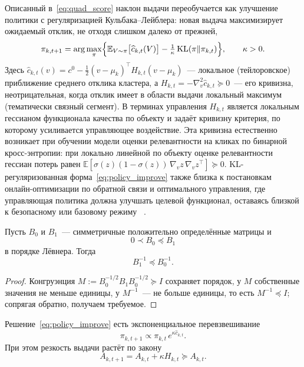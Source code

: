 Описанный в~\eqref{eq:quad_score} наклон выдачи переобучается как улучшение
политики с регуляризацией Кульбака--Лейблера: новая выдача максимизирует
ожидаемый отклик, не отходя слишком далеко от прежней,
\begin{equation}
    \pi_{k,t+1}=\arg\max_{\pi}\Bigl\{
    \mathbb E_{V\sim\pi}\bigl[\widehat c_{k,t}(V)\bigr]
    -\tfrac1\kappa\,\mathrm{KL}(\pi\Vert\pi_{k,t})\Bigr\},
    \qquad \kappa>0.
    \label{eq:policy_improve}
\end{equation}
Здесь $\widehat c_{k,t}(v)=c^0-\tfrac12(v-\mu_k)^\top H_{k,t}(v-\mu_k)$~---
локальное (тейлоровское) приближение среднего отклика кластера, а
$H_{k,t}=-\nabla_v^2 \widehat c_{k,t}\succeq0$~--- его кривизна, неотрицательная,
когда отклик имеет в области выдачи локальный максимум (тематически связный
сегмент). В терминах управления $H_{k,t}$ является локальным гессианом
функционала качества по объекту и задаёт кривизну критерия, по которому
усиливается управляющее воздействие. Эта кривизна естественно возникает при
обучении модели оценки релевантности на кликах по бинарной кросс-энтропии: при
локально линейной по объекту оценке релевантности гессиан потерь равен
$\mathbb E[\sigma(z)(1-\sigma(z))\,\nabla_v z\,\nabla_v z^\top]\succeq0$.
KL-регуляризованная форма~\eqref{eq:policy_improve} также близка к
постановкам онлайн-оптимизации по обратной связи и оптимального управления, где управляющая политика должна
улучшать целевой функционал, оставаясь близкой к безопасному или базовому режиму
~\cite{boyd2004, chow2014baselineControl, mariano2026optimalControl,
chandrasekaran2026networkAware}.

\begin{lemma}
\label{lem:loewner}
Пусть $B_0$ и $B_1$~--- симметричные положительно определённые матрицы и
\[
    0\prec B_0\preceq B_1
\]
в порядке Лёвнера. Тогда
\[
    B_1^{-1}\preceq B_0^{-1}.
\]
\end{lemma}

\begin{proof}
Конгруэнция $M:=B_0^{-1/2}B_1B_0^{-1/2}\succeq I$
сохраняет порядок, у $M$ собственные значения не меньше единицы, у
$M^{-1}$~--- не больше единицы, то есть $M^{-1}\preceq I$; сопрягая обратно,
получаем требуемое.
\end{proof}

\begin{proposition}
\label{prop:sharpen}
Решение~\eqref{eq:policy_improve} есть экспоненциальное перевзвешивание
\[
    \pi_{k,t+1}\propto\pi_{k,t}\,e^{\kappa\widehat c_{k,t}}.
\]
При этом резкость выдачи растёт по закону
\[
    A_{k,t+1}=A_{k,t}+\kappa H_{k,t}\succeq A_{k,t}.
\]
\end{proposition}

